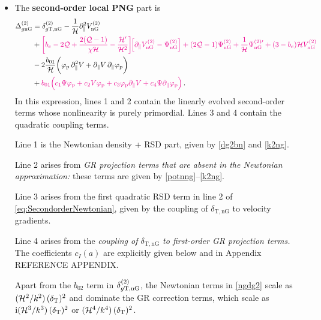 {{{{\begin{itemize}
The  quadratic terms in \eqref{odg2} are given in full by \cite{Jolicoeur:2017nyt}. For convenience,  Appendix REFERENCE APPENDIX presents all of the terms in  \eqref{odg2}, correcting some errors in \cite{Jolicoeur:2017nyt}. 

\item
 The {\bfseries second-order local PNG} part is 
 \begin{align}
\Delta_{g\mathrm{nG}}^{(2)} &= \delta^{(2)}_{g{\mathrm{T,nG}}} 
- \frac{1}{\mathcal{H}}\partial_{\parallel}^{2}V_{\mathrm{nG}}^{(2)}\notag \\
& + {\color{magenta}{\bigg[b_{e} - 2\mathcal{Q} +\frac{2(\mathcal{Q}-1)}{\chi\mathcal{H}}- \frac{\mathcal{H}'}{\mathcal{H}^{2}} \bigg]\!\!\left[\partial_{\parallel}V^{(2)}_{\mathrm{nG}} -\Psi^{(2)}_{\mathrm{nG}} \right]
 +(2\mathcal{Q}-1)\Psi^{(2)}_{\mathrm{nG}} + \frac{1}{\mathcal{H}}\Psi^{(2)\prime}_{\mathrm{nG}} +(3-b_e){\cal H}V^{(2)}_{\mathrm{nG}}}}
 \nonumber \\
\label{ngdg2}
&- 2\frac{b_{01}}{\mathcal{H}}\bigg(\varphi_{\mathrm{p}}\,\partial_{\parallel}^{2}V + \partial_{\parallel}V\,\partial_{\parallel}\varphi_{\mathrm{p}}\bigg) \notag\\
& + {\color{magenta}{b_{01} \Big(c_1 \Psi \varphi_{\mathrm{p}} + c_2 V \varphi_{\mathrm{p}}+c_3 \varphi_{\mathrm{p}} \partial_{\parallel}V + c_4 \Psi \partial_{\parallel}\varphi_{\mathrm{p}} \Big)}}\,.
\end{align}
In this expression,  lines 1 and 2 contain the linearly evolved second-order terms  whose nonlinearity is purely primordial. Lines 3 and 4 contain the quadratic coupling terms. 

Line 1 is the Newtonian density + RSD  part, given by \eqref{dg2bn} and  \eqref{k2ng}. 

Line 2 arises from {\em GR projection terms that are absent in the Newtonian approximation:} these terms are given by \eqref{potnng}--\eqref{k2ng}. 

Line 3 arises from the first quadratic RSD term  in line 2 of \eqref{eq:SecondorderNewtonian}, given by the coupling of $\delta_{\mathrm{T,nG}}$ to velocity gradients.

Line 4 arises from the {\em coupling of $\delta_{\mathrm{T,nG}}$  to first-order GR projection terms.}  The  coefficients $c_I(a)$ are explicitly given below and in Appendix REFERENCE APPENDIX.

{Apart from the $b_{02}$ term in $\delta^{(2)}_{g{\mathrm{T,nG}}}$, the Newtonian terms in \eqref{ngdg2} scale as $(\mathcal{H}^2/k^2)\,(\delta_{\mathrm{T}})^2$  and dominate the  GR correction terms, which scale as ${\mathrm{i}}(\mathcal{H}^3/k^3)\,(\delta_{\mathrm{T}})^2$ or $(\mathcal{H}^4/k^4)\,(\delta_{\mathrm{T}})^2$.}


\end{itemize}}}}}
